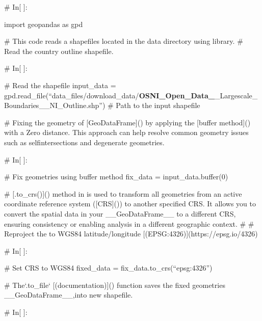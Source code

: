 \documentclass[letterpaper,10pt,english]{sphinxmanual}
\begin{document}
\sphinxAtStartPar
\# In{[} {]}:

\sphinxAtStartPar
import geopandas as gpd

\sphinxAtStartPar
\# This code reads a shapefiles located in the data directory using  library.
\# Read the country outline shapefile.

\sphinxAtStartPar
\# In{[} {]}:

\sphinxAtStartPar
\# Read the shapefile
input\_data = gpd.read\_file(“data\_files/download\_data/{\color{red}\bfseries{}OSNI\_Open\_Data\_}\sphinxhyphen{}\_Largescale\_Boundaries\_\sphinxhyphen{}\_NI\_Outline.shp”)  \# Path to the input shapefile

\sphinxAtStartPar
\# Fixing the geometry of {[}GeoDataFrame{]}() by applying the {[}buffer method{]}() with a Zero distance. This approach can help resolve common geometry issues such as self\sphinxhyphen{}intersections and degenerate geometries.

\sphinxAtStartPar
\# In{[} {]}:

\sphinxAtStartPar
\# Fix geometries using buffer method
fix\_data = input\_data.buffer(0)

\sphinxAtStartPar
\# {[}.to\_crs(){]}() method in  is used to transform all geometries from an active coordinate reference system ({[}CRS{]}()) to another specified CRS. It allows you to convert the spatial data in your \_\_GeoDataFrame\_\_ to a different CRS, ensuring consistency or enabling analysis in a different geographic context.
\#
\# Re\sphinxhyphen{}project the  to WGS84 latitude/longitude {[}(EPSG:4326){]}(https://epsg.io/4326)

\sphinxAtStartPar
\# In{[} {]}:

\sphinxAtStartPar
\# Set CRS to WGS84
fixed\_data = fix\_data.to\_crs(“epsg:4326”)

\sphinxAtStartPar
\# The`.to\_file` {[}(documentation){]}() function saves the fixed geometries \_\_GeoDataFrame\_\_,into new shapefile.

\sphinxAtStartPar
\# In{[} {]}:
\end{document}
